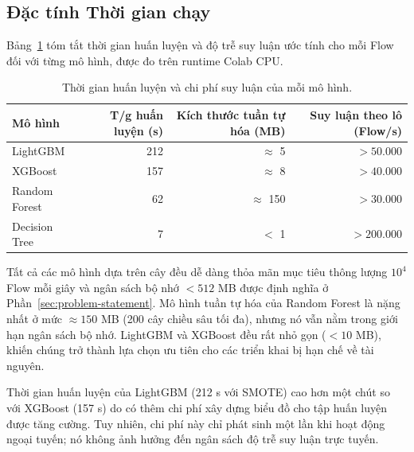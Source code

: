 \subsection{Đặc tính Thời gian chạy}
\label{sec:exp-latency}

Bảng~\ref{tab:runtime} tóm tắt thời gian huấn luyện và độ trễ suy luận ước tính cho mỗi Flow đối với từng mô hình, được đo trên runtime Colab CPU.

\begin{table}[h]
\centering
\caption{Thời gian huấn luyện và chi phí suy luận của mỗi mô hình.}
\label{tab:runtime}
\begin{tabular}{lrrr}
\toprule
\textbf{Mô hình} & \textbf{T/g huấn luyện (s)} & \textbf{Kích thước tuần tự hóa (MB)} & \textbf{Suy luận theo lô (Flow/s)}  \\
\midrule
LightGBM      & 212 & $\approx$ 5   & $> 50{.}000$  \\
XGBoost       & 157 & $\approx$ 8   & $> 40{.}000$  \\
Random Forest &  62 & $\approx$ 150 & $> 30{.}000$  \\
Decision Tree &   7 & $<$ 1         & $> 200{.}000$  \\
\bottomrule
\end{tabular}
\end{table}

\noindent Tất cả các mô hình dựa trên cây đều dễ dàng thỏa mãn mục tiêu thông lượng $10^4$ Flow mỗi giây và ngân sách bộ nhớ $< 512$ MB được định nghĩa ở Phần~\ref{sec:problem-statement}. Mô hình tuần tự hóa của Random Forest là nặng nhất ở mức $\approx 150$ MB (200 cây chiều sâu tối đa), nhưng nó vẫn nằm trong giới hạn ngân sách bộ nhớ. LightGBM và XGBoost đều rất nhỏ gọn ($< 10$ MB), khiến chúng trở thành lựa chọn ưu tiên cho các triển khai bị hạn chế về tài nguyên.

Thời gian huấn luyện của LightGBM (212 s với SMOTE) cao hơn một chút so với XGBoost (157 s) do có thêm chi phí xây dựng biểu đồ cho tập huấn luyện được tăng cường. Tuy nhiên, chi phí này chỉ phát sinh một lần khi hoạt động ngoại tuyến; nó không ảnh hưởng đến ngân sách độ trễ suy luận trực tuyến.
